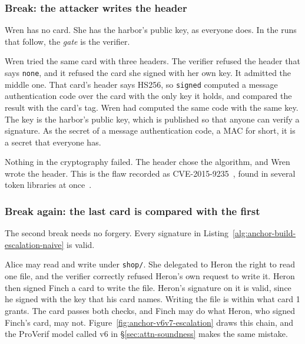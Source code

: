 \subsubsection{Break: the attacker writes the header}

Wren has no card. She has the harbor's public key, as everyone does. In the
runs that follow, the \emph{gate} is the verifier.


Wren tried the same card with three headers. The verifier refused the
header that says \texttt{none}, and it refused the card she signed with her
own key. It admitted the middle one. That card's header says HS256, so
\texttt{signed} computed a message authentication code over the card with the
only key it holds, and compared the result with the card's tag. Wren had
computed the same code with the same key. The key is the harbor's public key,
which is published so that anyone can verify a signature. As the secret of a
message authentication code, a MAC for short, it is a secret that everyone
has.

Nothing in the cryptography failed. The header chose the algorithm, and
Wren wrote the header. This is the flaw recorded as
CVE-2015-9235~, found in several token libraries at
once~.

\subsubsection{Break again: the last card is compared with the first}

The second break needs no forgery. Every signature in
Listing~\ref{alg:anchor-build-escalation-naive} is valid.


Alice may read and write under \texttt{shop/}. She delegated to Heron the
right to read one file, and the verifier correctly refused Heron's own
request to write it. Heron then signed Finch a card to write the file.
Heron's signature on it is valid, since he signed with the key that his card
names. Writing the file is within what card 1 grants. The card passes both
checks, and Finch may do what Heron, who signed Finch's card, may not.
Figure~\ref{fig:anchor-v6v7-escalation} draws this chain, and the ProVerif
model called v6 in \S\ref{sec:attn-soundness} makes the same mistake.

